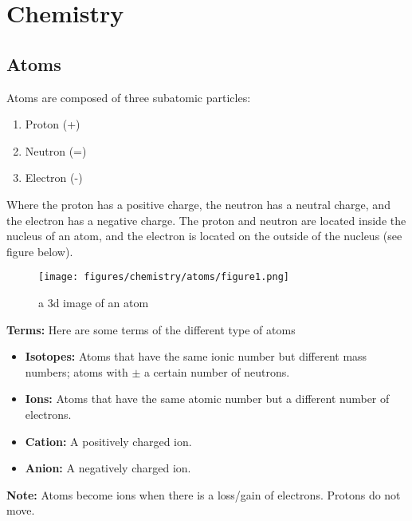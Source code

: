 \documentclass[12pt]{report}
\begin{document}
\tableofcontents 

\newpage
\chapter{Chemistry}

\section{Atoms}
Atoms are composed of three subatomic particles:
\begin{enumerate}
\setlength\itemsep{1em}
    \item{Proton (+)}
    \item{Neutron (=)}
    \item{Electron (-)}
\end{enumerate}
Where the proton has a positive charge, the neutron has a neutral charge, and the electron has a negative charge. The proton and neutron are located inside the nucleus of an atom, and the electron is located on the outside of the nucleus (see figure below).  
\begin{figure}[htb!]
\centering
\texttt{[image: figures/chemistry/atoms/figure1.png]}
    \caption{a 3d image of an atom}
\end{figure}

\textbf{Terms:} Here are some terms of the different type of atoms 
\begin{itemize}
    \item{ \textbf{Isotopes:} Atoms that have the same ionic number but different mass numbers; atoms with $\pm$ a certain number of neutrons.}
    \item{ \textbf{Ions:} Atoms that have the same atomic number but a different number of electrons.}
    \item{ \textbf{Cation:} A positively charged ion.}
    \item{ \textbf{Anion:} A negatively charged ion.}
\end{itemize}

\textbf{Note:} Atoms become ions when there is a loss/gain of electrons. Protons do not move.

\newpage
\end{document}
